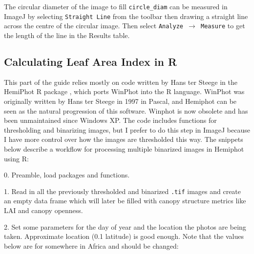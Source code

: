 \documentclass[11pt,a4paper]{article}
\newcommand\menu[1]{\texttt{\color{menu}#1}}  %
\newcommand\file[1]{\texttt{\color{file}#1}}  %
\begin{document}
\begin{minipage}{\linewidth}

\end{minipage}

The circular diameter of the image to fill \texttt{circle\_diam} can be measured in ImageJ by selecting \menu{Straight Line} from the toolbar then drawing a straight line across the centre of the circular image. Then select \menu{Analyze $\rightarrow$ Measure} to get the length of the line in the Results table.

\subsection{Calculating Leaf Area Index in R}

This part of the guide relies mostly on code written by Hans ter Steege in the HemiPhot R package \citep{Steege2018}, which ports WinPhot into the R language. WinPhot was originally written by Hans ter Steege in 1997 in Pascal, and Hemiphot can be seen as the natural progression of this software. Winphot is now obsolete and has been unmaintained since Windows XP. The code includes functions for thresholding and binarizing images, but I prefer to do this step in ImageJ because I have more control over how the images are thresholded this way. The snippets below describe a workflow for processing multiple binarized images in Hemiphot using R:

\vspace{0.5cm}
\begin{minipage}{\linewidth}
0. Preamble, load packages and functions.

\end{minipage}

\begin{minipage}{\linewidth}
1. Read in all the previously thresholded and binarized \file{.tif} images and create an empty data frame which will later be filled with canopy structure metrics like LAI and canopy openness.

\end{minipage}


\begin{minipage}{\linewidth}
	2. Set some parameters for the day of year and the location the photos are being taken. Approximate location (0.1\textdegree{} latitude) is good enough. Note that the values below are for somewhere in Africa and should be changed:

\end{minipage}
\end{document}
